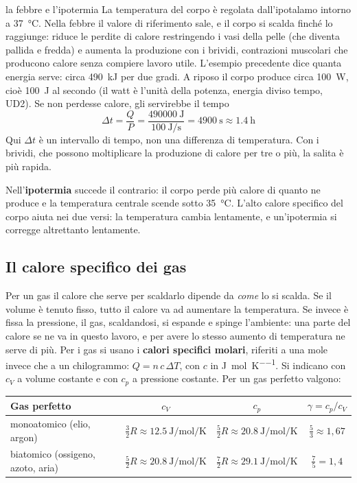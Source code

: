 \begin{applicazione}{la febbre e l'ipotermia}
La temperatura del corpo è regolata dall'ipotalamo intorno a \SI{37}{\celsius}. Nella febbre il valore di riferimento sale, e il corpo si scalda finché lo raggiunge: riduce le perdite di calore restringendo i vasi della pelle (che diventa pallida e fredda) e aumenta la produzione con i brividi, contrazioni muscolari che producono calore senza compiere lavoro utile. L'esempio precedente dice quanta energia serve: circa \SI{490}{\kilo\joule} per due gradi. A riposo il corpo produce circa \SI{100}{\watt}, cioè \SI{100}{\joule} al secondo (il watt è l'unità della potenza, energia diviso tempo, UD2). Se non perdesse calore, gli servirebbe il tempo
\[
  \Delta t = \frac{Q}{P} = \frac{\SI{490000}{\joule}}{\SI{100}{\joule\per\second}} = \SI{4900}{\second} \approx \SI{1,4}{\hour}
\]
Qui $\Delta t$ è un intervallo di tempo, non una differenza di temperatura. Con i brividi, che possono moltiplicare la produzione di calore per tre o più, la salita è più rapida.

Nell'\textbf{ipotermia} succede il contrario: il corpo perde più calore di quanto ne produce e la temperatura centrale scende sotto \SI{35}{\celsius}. L'alto calore specifico del corpo aiuta nei due versi: la temperatura cambia lentamente, e un'ipotermia si corregge altrettanto lentamente.
\end{applicazione}

\subsection{Il calore specifico dei gas}

Per un gas il calore che serve per scaldarlo dipende da \emph{come} lo si scalda. Se il volume è tenuto fisso, tutto il calore va ad aumentare la temperatura. Se invece è fissa la pressione, il gas, scaldandosi, si espande e spinge l'ambiente: una parte del calore se ne va in questo lavoro, e per avere lo stesso aumento di temperatura ne serve di più. Per i gas si usano i \textbf{calori specifici molari}, riferiti a una mole invece che a un chilogrammo: $Q = n\,c\,\Delta T$, con $c$ in \si{\joule\per\mole\per\kelvin}. Si indicano con $c_V$ a volume costante e con $c_p$ a pressione costante. Per un gas perfetto valgono:

\begin{center}
\small
\begin{tabular}{@{}lccc@{}}
\toprule
Gas perfetto & $c_V$ & $c_p$ & $\gamma = c_p / c_V$ \\
\midrule
monoatomico (elio, argon) & $\frac{3}{2}R \approx \SI{12,5}{\joule\per\mole\per\kelvin}$ & $\frac{5}{2}R \approx \SI{20,8}{\joule\per\mole\per\kelvin}$ & $\frac{5}{3} \approx 1{,}67$ \\ \addlinespace[3pt]
biatomico (ossigeno, azoto, aria) & $\frac{5}{2}R \approx \SI{20,8}{\joule\per\mole\per\kelvin}$ & $\frac{7}{2}R \approx \SI{29,1}{\joule\per\mole\per\kelvin}$ & $\frac{7}{5} = 1{,}4$ \\
\bottomrule
\end{tabular}
\end{center}

